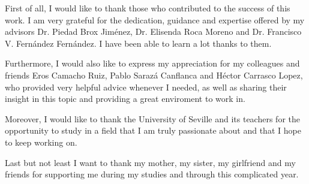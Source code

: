 First of all, I would like to thank those who contributed to the success of this work. I am very grateful for the dedication, guidance and expertise offered by my advisors Dr. Piedad Brox Jiménez, Dr. Elisenda Roca Moreno and Dr. Francisco V. Fernández Fernández. I have been able to learn a lot thanks to them.

Furthermore, I would also like to express my appreciation for my colleagues and friends Eros Camacho Ruiz, Pablo Sarazá Canflanca and Héctor Carrasco Lopez, who provided very helpful advice whenever I needed, as well as sharing their insight in this topic and providing a great enviroment to work in. 

Moreover, I would like to thank the University of Seville and its teachers for the opportunity to study in a field that I am truly passionate about and that I hope to keep working on.   

Last but not least I want to thank my mother, my sister, my girlfriend and my friends for supporting me during my studies and through this complicated year. 